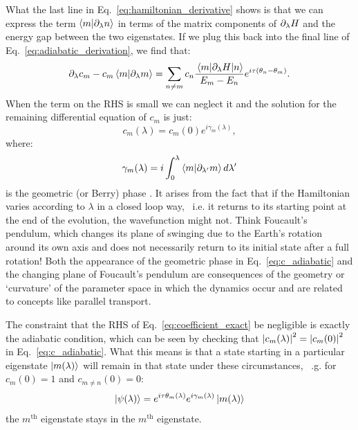     What the last line in Eq.~\eqref{eq:hamiltonian_derivative} shows is that we can express the term $\braket{m}{\partial_{\lambda} n}$ in terms of the matrix components of $\partial_{\lambda} H$ and the energy gap between the two eigenstates. If we plug this back into the final line of Eq.~\eqref{eq:adiabatic_derivation}, we find that:
    \begin{equation}\label{eq:coefficient_exact}
            \partial_{\lambda} c_m -  c_m \braket{m}{\partial_{\lambda} m} = \sum_{n \neq m} c_n  \frac{\mel{m}{\partial_{\lambda}H}{n}}{E_m - E_n}e^{i \tau (\theta_n-\theta_m)}.
    \end{equation}
    When the term on the RHS is small we can neglect it and the solution for the remaining differential equation of $c_m$ is just:
    \begin{equation}\label{eq:c_adiabatic}
        c_m(\lambda) = c_m(0)e^{i \gamma_m(\lambda)},
    \end{equation}
    where:
    \begin{equation}\label{eq:geometric_phase}
        \gamma_m(\lambda) = i \int_0^{\lambda} \braket{m}{\partial_{\lambda'} m} d \lambda' 
    \end{equation}
    is the geometric (or Berry) phase \cite{pancharatnam_generalized_1956, longuet-higgins_studies_1958, berry_quantal_1984}. It arises from the fact that if the Hamiltonian varies according to $\lambda$ in a closed loop way, \@~i.e. it returns to its starting point at the end of the evolution, the wavefunction might not. Think Foucault's pendulum, which changes its plane of swinging due to the Earth's rotation around its own axis and does not necessarily return to its initial state after a full rotation! Both the appearance of the geometric phase in Eq.~\eqref{eq:c_adiabatic} and the changing plane of Foucault's pendulum are consequences of the geometry or `curvature' of the parameter space in which the dynamics occur and are related to concepts like parallel transport.  

    The constraint that the RHS of Eq.~\eqref{eq:coefficient_exact} be negligible is exactly the adiabatic condition, which can be seen by checking that $\abs{c_m(\lambda)}^2 = \abs{c_m(0)}^2$ in Eq.~\eqref{eq:c_adiabatic}. What this means is that a state starting in a particular eigenstate $\ket{m(\lambda)}$ will remain in that state under these circumstances, ~\@e.g. for $c_m(0) = 1$ and $c_{m \neq n}(0) = 0$:
    \begin{equation}\label{eq:adiabatic_states}
        \ket{\psi(\lambda)} = e^{i \tau \theta_m(\lambda)}e^{i \gamma_m(\lambda)} \ket{m(\lambda)}
    \end{equation}
    the $m^{\text{th}}$ eigenstate stays in the $m^{\text{th}}$ eigenstate.
    
